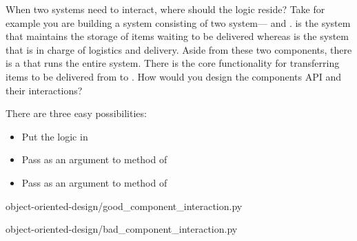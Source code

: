When two systems need to interact, where should the logic reside?
Take for example you are building a system consisting of two system--- and
.
 is the system that maintains the storage of items waiting to be delivered whereas
 is the system that is in charge of logistics and delivery.
Aside from these two components, there is a  that runs the entire system.
There is the core functionality for transferring items to be delivered from  to
.
How would you design the components API and their interactions?

There are three easy possibilities:
\begin{itemize}
    \item Put the logic in 
    \item Pass  as an argument to method of 
    \item Pass  as an argument to method of 
\end{itemize}


{object-oriented-design/good_component_interaction.py}


{object-oriented-design/bad_component_interaction.py}
